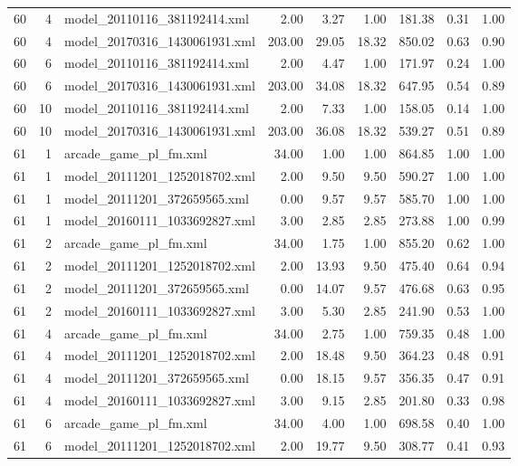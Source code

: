 \begin{table}[ht]
\begin{tabular}{rrlrrrrrr}
   60 &   4 & model\_20110116\_381192414.xml & 2.00 & 3.27 & 1.00 & 181.38 & 0.31 & 1.00 \\ 
   60 &   4 & model\_20170316\_1430061931.xml & 203.00 & 29.05 & 18.32 & 850.02 & 0.63 & 0.90 \\ 
   60 &   6 & model\_20110116\_381192414.xml & 2.00 & 4.47 & 1.00 & 171.97 & 0.24 & 1.00 \\ 
   60 &   6 & model\_20170316\_1430061931.xml & 203.00 & 34.08 & 18.32 & 647.95 & 0.54 & 0.89 \\ 
   60 &  10 & model\_20110116\_381192414.xml & 2.00 & 7.33 & 1.00 & 158.05 & 0.14 & 1.00 \\ 
   60 &  10 & model\_20170316\_1430061931.xml & 203.00 & 36.08 & 18.32 & 539.27 & 0.51 & 0.89 \\ 
   61 &   1 & arcade\_game\_pl\_fm.xml & 34.00 & 1.00 & 1.00 & 864.85 & 1.00 & 1.00 \\ 
   61 &   1 & model\_20111201\_1252018702.xml & 2.00 & 9.50 & 9.50 & 590.27 & 1.00 & 1.00 \\ 
   61 &   1 & model\_20111201\_372659565.xml & 0.00 & 9.57 & 9.57 & 585.70 & 1.00 & 1.00 \\ 
   61 &   1 & model\_20160111\_1033692827.xml & 3.00 & 2.85 & 2.85 & 273.88 & 1.00 & 0.99 \\ 
   61 &   2 & arcade\_game\_pl\_fm.xml & 34.00 & 1.75 & 1.00 & 855.20 & 0.62 & 1.00 \\ 
   61 &   2 & model\_20111201\_1252018702.xml & 2.00 & 13.93 & 9.50 & 475.40 & 0.64 & 0.94 \\ 
   61 &   2 & model\_20111201\_372659565.xml & 0.00 & 14.07 & 9.57 & 476.68 & 0.63 & 0.95 \\ 
   61 &   2 & model\_20160111\_1033692827.xml & 3.00 & 5.30 & 2.85 & 241.90 & 0.53 & 1.00 \\ 
   61 &   4 & arcade\_game\_pl\_fm.xml & 34.00 & 2.75 & 1.00 & 759.35 & 0.48 & 1.00 \\ 
   61 &   4 & model\_20111201\_1252018702.xml & 2.00 & 18.48 & 9.50 & 364.23 & 0.48 & 0.91 \\ 
   61 &   4 & model\_20111201\_372659565.xml & 0.00 & 18.15 & 9.57 & 356.35 & 0.47 & 0.91 \\ 
   61 &   4 & model\_20160111\_1033692827.xml & 3.00 & 9.15 & 2.85 & 201.80 & 0.33 & 0.98 \\ 
   61 &   6 & arcade\_game\_pl\_fm.xml & 34.00 & 4.00 & 1.00 & 698.58 & 0.40 & 1.00 \\ 
   61 &   6 & model\_20111201\_1252018702.xml & 2.00 & 19.77 & 9.50 & 308.77 & 0.41 & 0.93 \\ 

\end{tabular}
\end{table}

